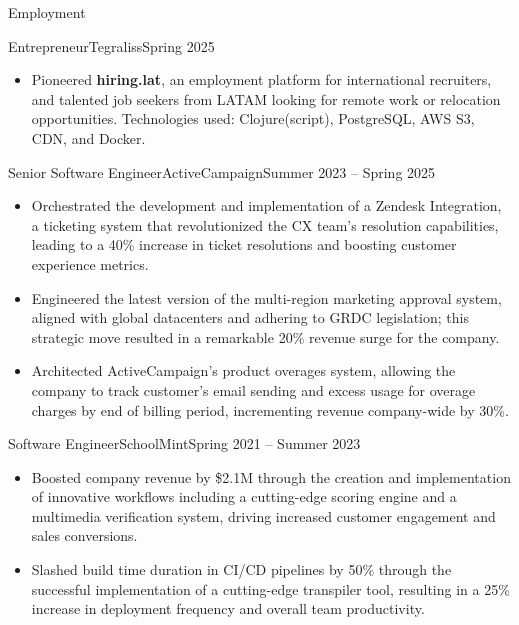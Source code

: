 \documentclass[]{mcdowellcv}
\begin{document}
	\makeheader
	\begin{cvsection}{Employment}
		\begin{cvsubsection}{Entrepreneur}{Tegraliss}{Spring 2025}
			\begin{itemize}
				\item Pioneered \textbf{hiring.lat}, an employment platform for international recruiters, and talented job seekers from LATAM looking for remote work or relocation opportunities. Technologies used: Clojure(script), PostgreSQL, AWS S3, CDN, and Docker.
			\end{itemize}
		\end{cvsubsection}
		\begin{cvsubsection}{Senior Software Engineer}{ActiveCampaign}{Summer 2023 -- Spring 2025}
			\begin{itemize}
				\item Orchestrated the development and implementation of a Zendesk Integration, a ticketing system that revolutionized the CX team's resolution capabilities, leading to a 40\% increase in ticket resolutions and boosting customer experience metrics.
			\end{itemize}
			\begin{itemize}
				\item Engineered the latest version of the multi-region marketing approval system, aligned with global datacenters and adhering to GRDC legislation; this strategic move resulted in a remarkable 20\% revenue surge for the company.
			\end{itemize}
			\begin{itemize}
				\item Architected ActiveCampaign's product overages system, allowing the company to track customer's email sending and excess usage for overage charges by end of billing period, incrementing revenue company-wide by 30\%.
			\end{itemize}
		\end{cvsubsection}
		\begin{cvsubsection}{Software Engineer}{SchoolMint}{Spring 2021 -- Summer 2023}		
			\begin{itemize}
				\item Boosted company revenue by \$2.1M through the creation and implementation of innovative workflows including a cutting-edge scoring engine and a multimedia verification system, driving increased customer engagement and sales conversions.
				\item Slashed build time duration in CI/CD pipelines by 50\% through the successful implementation of a cutting-edge transpiler tool, resulting in a 25\% increase in deployment frequency and overall team productivity.

\end{itemize}
\end{cvsubsection}
\end{cvsection}
\end{document}
